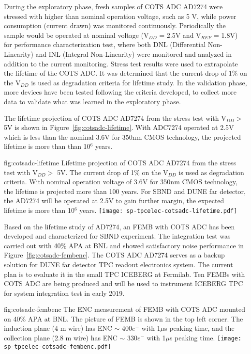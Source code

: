During the exploratory phase, fresh samples of COTS ADC AD7274 were stressed with higher than nominal operation voltage, such as 5 V, while power consumption (current drawn) was monitored continuously. Periodically the sample would be operated at nominal voltage (V$_{DD}$ = 2.5V and V$_{REF}$ = 1.8V) for performance characterization test, where both DNL (Differential Non-Linearity) and INL (Integral Non-Linearity) were monitored and analyzed in addition to the current monitoring. Stress test results were used to extrapolate the lifetime of the COTS ADC. It was determined that the current drop of 1\% on the V$_{DD}$ is used as degradation criteria for lifetime study. In the validation phase, more devices have been tested following the criteria developed, to collect more data to validate what was learned in the exploratory phase.

The lifetime projection of COTS ADC AD7274 from the stress test with V$_{DD} >$ 5V is shown in Figure~\ref{fig:cotsadc-lifetime}. With ADC7274 operated at 2.5V which is less than the nominal 3.6V for 350nm CMOS technology, the projected lifetime is more than than 10$^6$ years.

\begin{dunefigure}
{fig:cotsadc-lifetime}
{Lifetime projection of COTS ADC AD7274 from the stress test with V$_{DD} >$ 5V. The current drop of 1\% on the V$_{DD}$ is used as degradation criteria. With nominal operation voltage of 3.6V for 350nm CMOS technology, the lifetime is projected more than 100 years. For SBND and DUNE far detector, the AD7274 will be operated at 2.5V to gain further margin, the expected lifetime is more than 10$^6$ years.}
\texttt{[image: sp-tpcelec-cotsadc-lifetime.pdf]}
\end{dunefigure}

Based on the lifetime study of AD7274, an FEMB with COTS ADC has been developed and characterized for SBND experiment. The integration test was carried out with 40\% APA at BNL and showed satisfactory noise performance in Figure~\ref{fig:cotsadc-fembenc}. The COTS ADC AD7274 serves as a backup solution for DUNE far detector TPC readout electronics system. The current plan is to evaluate it in the small TPC ICEBERG at Fermilab. Ten FEMBs with COTS ADC are being produced and will be used to instrument ICEBERG TPC for system integration test in early 2019. 

\begin{dunefigure}
{fig:cotsadc-fembenc}
{The ENC measurement of FEMB with COTS ADC mounted on 40\% APA at BNL. The picture of FEMB is shown in the top left corner. The induction plane (4 m wire) has ENC $\sim$ 400$e^-$ with 1$\mu$s peaking time, and the collection plane (2.8 m wire) has ENC $\sim$ 330$e^-$ with 1$\mu$s peaking time.}
\texttt{[image: sp-tpcelec-cotsadc-fembenc.pdf]}
\end{dunefigure}

